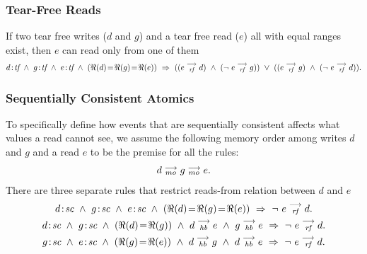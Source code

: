       \subsubsection{Tear-Free Reads} 
               If two tear free writes ($d$ and $g$) and a tear free read ($e$) all with equal ranges exist, then $e$ can read only from one of them
                \begin{align*}
                      \et{d}{tf}\ \wedge\ \et{g}{tf} \ \wedge \ \et{e}{tf} 
                        \ \wedge \ 
                        (\Re(d) \!=\! \Re(g) \!=\! \Re(e)) 
                        \ \Rightarrow{} \ 
                            ((\reln{e}{rf}{d}) 
                            \ \wedge \ 
                            (\neg \ \reln{e}{rf}{g})) 
                        \ \vee \  
                            ((\reln{e}{rf}{g}) 
                            \ \wedge \
                            (\neg \ \reln{e}{rf}{d})).
                \end{align*}
                    
        \subsubsection{Sequentially Consistent Atomics} 
            To specifically define how events that are sequentially consistent affects what values a read cannot see, we assume the following memory order among writes $d$ and $g$ and a read $e$ to be the premise for all the rules: 
                \begin{align*}
                    d \stackrel{\longrightarrow}{_{mo}} g \stackrel{\longrightarrow}{_{mo}} e.
                \end{align*}
            There are three separate rules that restrict reads-from relation between $d$ and $e$
                \begin{gather*}
                        \et{d}{sc}\ \wedge\ \et{g}{sc}\ \wedge\ \et{e}{sc} 
                        \ \wedge \ (\Re(d) \!=\! \Re(g) \!=\! \Re(e))
                        \ \Rightarrow{} \ 
                        \neg \ \reln{e}{rf}{d}.
                    \\    
                        \et{d}{sc}\ \wedge\ \et{g}{sc}  
                        \ \wedge \ (\Re(d) \!=\! \Re(g)) 
                        \ \wedge \ \reln{d}{hb}{e}
                        \ \wedge \ \reln{g}{hb}{e}
                        \ \Rightarrow{}\  
                        \neg \ \reln{e}{rf}{d}.
                    \\
                        \et{g}{sc}\ \wedge\ \et{e}{sc}  
                        \ \wedge \ (\Re(g) \!= \!\Re(e)) 
                        \ \wedge \ \reln{d}{hb}{g} 
                        \ \wedge \ \reln{d}{hb}{e}
                        \ \Rightarrow \ 
                        \neg \ \reln{e}{rf}{d}.
                \end{gather*}
  